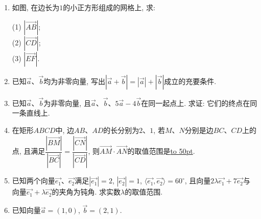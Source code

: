 \documentclass[10pt,a4paper]{article}
\newcommand{\blank}[1]{\underline{\hbox to #1pt{}}}
\begin{document}
\begin{enumerate}
\vspace*{3cm}
\item 如图, 在边长为$1$的小正方形组成的网格上, 求:
\begin{center}
\end{center}
(1) $|\overrightarrow{AB}|$;\\
(2) $|\overrightarrow{CD}|$;\\
(3) $|\overrightarrow{EF}|$.
\vspace*{3cm}
\item 已知$\overrightarrow a$、$\overrightarrow b$均为非零向量, 写出$|\overrightarrow a+\overrightarrow b|=|\overrightarrow a|+|\overrightarrow b|$成立的充要条件.
\vspace*{3cm}
\item 已知$\overrightarrow a$、$\overrightarrow b$为非零向量, 且$\overrightarrow a$、$\overrightarrow b$、$5\overrightarrow a-4\overrightarrow b$在同一起点上. 求证: 它们的终点在同一条直线上.
\vspace*{3cm}
\item 在矩形$ABCD$中, 边$AB$、$AD$的长分别为$2$、$1$, 若$M$、$N$分别是边$BC$、$CD$上的点, 且满足$\dfrac{|\overrightarrow{BM}|}{|\overrightarrow{BC}|}=\dfrac{|\overrightarrow{CN}|}{|\overrightarrow{CD}|}$, 则$\overrightarrow{AM}\cdot \overrightarrow{AN}$的取值范围是\blank{50}.
\vspace*{3cm}
\item 已知两个向量$\overrightarrow {e_1}$、$\overrightarrow {e_2}$满足$|\overrightarrow {e_1}|=2$, $|\overrightarrow {e_2}|=1$, $\langle \overrightarrow {e_1}, \overrightarrow {e_2}\rangle=60^\circ$, 且向量$2\lambda \overrightarrow {e_1}+7\overrightarrow {e_2}$与向量$\overrightarrow {e_1}+\lambda \overrightarrow {e_2}$的夹角为钝角. 求实数$\lambda$的取值范围.
\vspace*{3cm}
\item 已知向量$\overrightarrow a=(1, 0)$, $\overrightarrow b=(2, 1)$.\\

\end{enumerate}
\end{document}
